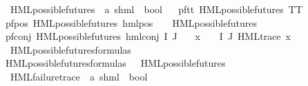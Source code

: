 \begin{isabellebody}
\isanewline
{}\isamarkupfalse%
\ HML{\isacharunderscore}{\kern0pt}possible{\isacharunderscore}{\kern0pt}futures\ {\isacharcolon}{\kern0pt}{\isacharcolon}{\kern0pt}\ {\isachardoublequoteopen}{\isacharparenleft}{\kern0pt}{\isacharprime}{\kern0pt}a{\isacharcomma}{\kern0pt}\ {\isacharprime}{\kern0pt}s{\isacharparenright}{\kern0pt}hml\ {\isasymRightarrow}\ bool{\isachardoublequoteclose}\isanewline
\ \ \isanewline
pf{\isacharunderscore}{\kern0pt}tt{\isacharcolon}{\kern0pt}\ {\isachardoublequoteopen}HML{\isacharunderscore}{\kern0pt}possible{\isacharunderscore}{\kern0pt}futures\ TT{\isachardoublequoteclose}\ {\isacharbar}{\kern0pt}\isanewline
pf{\isacharunderscore}{\kern0pt}pos{\isacharcolon}{\kern0pt}\ {\isachardoublequoteopen}HML{\isacharunderscore}{\kern0pt}possible{\isacharunderscore}{\kern0pt}futures\ {\isacharparenleft}{\kern0pt}hml{\isacharunderscore}{\kern0pt}pos\ {\isasymalpha}\ {\isasymphi}{\isacharparenright}{\kern0pt}{\isachardoublequoteclose}\ \ {\isachardoublequoteopen}HML{\isacharunderscore}{\kern0pt}possible{\isacharunderscore}{\kern0pt}futures\ {\isasymphi}{\isachardoublequoteclose}\ {\isacharbar}{\kern0pt}\isanewline
pf{\isacharunderscore}{\kern0pt}conj{\isacharcolon}{\kern0pt}\ {\isachardoublequoteopen}HML{\isacharunderscore}{\kern0pt}possible{\isacharunderscore}{\kern0pt}futures\ {\isacharparenleft}{\kern0pt}hml{\isacharunderscore}{\kern0pt}conj\ I\ J\ {\isasymPhi}{\isacharparenright}{\kern0pt}{\isachardoublequoteclose}\ \isanewline
{}\ {\isachardoublequoteopen}{\isasymforall}x\ {\isasymin}\ {\isacharparenleft}{\kern0pt}{\isasymPhi}\ {\isacharbackquote}{\kern0pt}\ {\isacharparenleft}{\kern0pt}I{\isasymunion}\ J{\isacharparenright}{\kern0pt}{\isacharparenright}{\kern0pt}{\isachardot}{\kern0pt}\ {\isacharparenleft}{\kern0pt}HML{\isacharunderscore}{\kern0pt}trace\ x{\isacharparenright}{\kern0pt}{\isachardoublequoteclose}\isanewline
\isanewline
{}\isamarkupfalse%
\ HML{\isacharunderscore}{\kern0pt}possible{\isacharunderscore}{\kern0pt}futures{\isacharunderscore}{\kern0pt}formulas\ \isanewline
{\isachardoublequoteopen}HML{\isacharunderscore}{\kern0pt}possible{\isacharunderscore}{\kern0pt}futures{\isacharunderscore}{\kern0pt}formulas\ {\isasymequiv}\ {\isacharbraceleft}{\kern0pt}{\isasymphi}{\isachardot}{\kern0pt}\ HML{\isacharunderscore}{\kern0pt}possible{\isacharunderscore}{\kern0pt}futures\ {\isasymphi}{\isacharbraceright}{\kern0pt}{\isachardoublequoteclose}\isanewline
\isanewline
{}\isamarkupfalse%
\ HML{\isacharunderscore}{\kern0pt}failure{\isacharunderscore}{\kern0pt}trace\ {\isacharcolon}{\kern0pt}{\isacharcolon}{\kern0pt}\ {\isachardoublequoteopen}{\isacharparenleft}{\kern0pt}{\isacharprime}{\kern0pt}a{\isacharcomma}{\kern0pt}\ {\isacharprime}{\kern0pt}s{\isacharparenright}{\kern0pt}hml\ {\isasymRightarrow}\ bool{\isachardoublequoteclose}\isanewline

\end{isabellebody}
